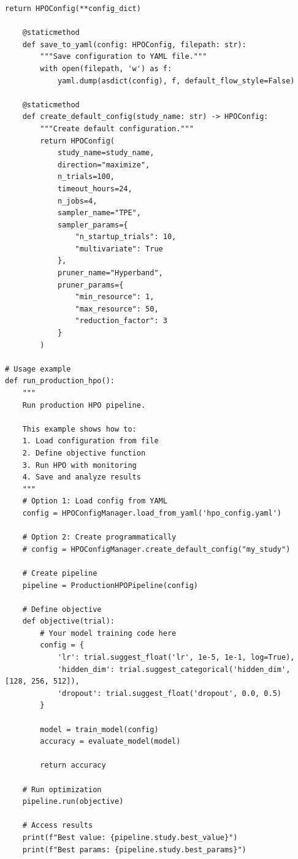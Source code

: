 \begin{lstlisting}[style=python, caption=Production-grade automated HPO pipeline]
        return HPOConfig(**config_dict)

    @staticmethod
    def save_to_yaml(config: HPOConfig, filepath: str):
        """Save configuration to YAML file."""
        with open(filepath, 'w') as f:
            yaml.dump(asdict(config), f, default_flow_style=False)

    @staticmethod
    def create_default_config(study_name: str) -> HPOConfig:
        """Create default configuration."""
        return HPOConfig(
            study_name=study_name,
            direction="maximize",
            n_trials=100,
            timeout_hours=24,
            n_jobs=4,
            sampler_name="TPE",
            sampler_params={
                "n_startup_trials": 10,
                "multivariate": True
            },
            pruner_name="Hyperband",
            pruner_params={
                "min_resource": 1,
                "max_resource": 50,
                "reduction_factor": 3
            }
        )

# Usage example
def run_production_hpo():
    """
    Run production HPO pipeline.

    This example shows how to:
    1. Load configuration from file
    2. Define objective function
    3. Run HPO with monitoring
    4. Save and analyze results
    """
    # Option 1: Load config from YAML
    config = HPOConfigManager.load_from_yaml('hpo_config.yaml')

    # Option 2: Create programmatically
    # config = HPOConfigManager.create_default_config("my_study")

    # Create pipeline
    pipeline = ProductionHPOPipeline(config)

    # Define objective
    def objective(trial):
        # Your model training code here
        config = {
            'lr': trial.suggest_float('lr', 1e-5, 1e-1, log=True),
            'hidden_dim': trial.suggest_categorical('hidden_dim', [128, 256, 512]),
            'dropout': trial.suggest_float('dropout', 0.0, 0.5)
        }

        model = train_model(config)
        accuracy = evaluate_model(model)

        return accuracy

    # Run optimization
    pipeline.run(objective)

    # Access results
    print(f"Best value: {pipeline.study.best_value}")
    print(f"Best params: {pipeline.study.best_params}")

\end{lstlisting}

